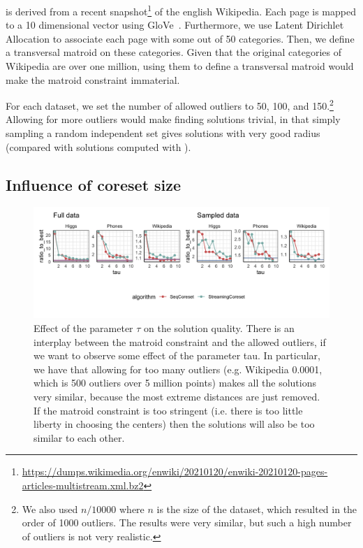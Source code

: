 \wiki is derived from a recent 
snapshot\footnote{\url{https://dumps.wikimedia.org/enwiki/20210120/enwiki-20210120-pages-articles-multistream.xml.bz2}}
of the english Wikipedia. Each page is mapped to a 10 dimensional vector using GloVe~\cite{DBLP:conf/emnlp/PenningtonSM14}.
Furthermore, we use Latent Dirichlet Allocation to associate each page with some out of 50 categories.
Then, we define a transversal matroid on these categories.
Given that the original categories of Wikipedia are over one million, using them to define a transversal matroid would make the
matroid constraint immaterial.

For each dataset, we set the number of allowed outliers to 50, 100, and 150.\footnote{We also used $n/10000$ where $n$ is the size of the dataset, which resulted in the order of 1000 outliers. The results were very similar, but such a high number of outliers is not very realistic.}
Allowing for more outliers would make finding solutions trivial, in that simply sampling a random independent set
gives solutions with very good radius (compared with solutions computed with \chen).

\subsection{Influence of coreset size}
\label{sec:exp:coreset-size}

\begin{figure}
    \includegraphics[width=\textwidth]{seq-effect-50}
    \caption{
        \label{fig:seq-effect}
        Effect of the parameter $\tau$ on the solution quality.
        There is an interplay between the matroid constraint and the allowed outliers, if we want to observe some effect of the parameter tau.
        In particular, we have that allowing for too many outliers (e.g. Wikipedia 0.0001, which is 500 outliers over 5 million points) makes all the solutions very similar, because the most extreme distances are just removed.
        If the matroid constraint is too stringent (i.e. there is too little liberty in choosing the centers)
        then the solutions will also be too similar to each other.
    }
\end{figure}

